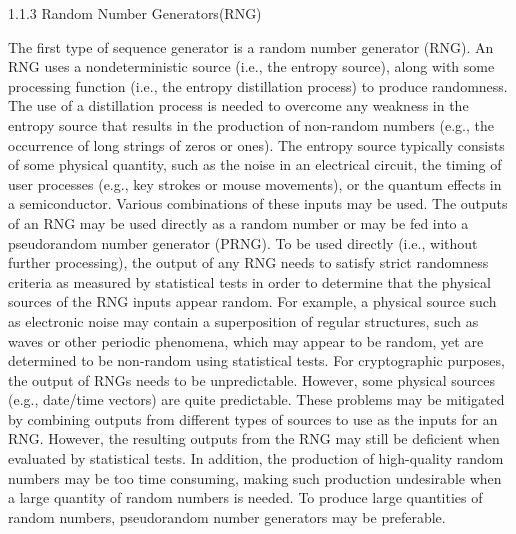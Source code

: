 1.1.3 Random Number Generators(RNG)

The first type of sequence generator is a random number generator (RNG). An RNG uses a nondeterministic source (i.e., the entropy source), along with some processing function (i.e., the entropy distillation process) to produce randomness. The use of a distillation process is needed to overcome any weakness in the entropy source that results in the production of non-random numbers (e.g., the occurrence of long strings of zeros or ones). The entropy source typically consists of some physical quantity, such as the noise in an electrical circuit, the timing of user processes (e.g., key strokes or mouse movements), or the quantum effects in a semiconductor. Various combinations of these inputs may be used. The outputs of an RNG may be used directly as a random number or may be fed into a pseudorandom number generator (PRNG). To be used directly (i.e., without further processing), the output of any RNG needs to satisfy strict randomness criteria as measured by statistical tests in order to determine that the physical sources of the RNG inputs appear random. For example, a physical source such as electronic noise may contain a superposition of regular structures, such as waves or other periodic phenomena, which may appear to be random, yet are determined to be non-random using statistical tests. For cryptographic purposes, the output of RNGs needs to be unpredictable. However, some physical sources (e.g., date/time vectors) are quite predictable. These problems may be mitigated by combining outputs from different types of sources to use as the inputs for an RNG. However, the resulting outputs from the RNG may still be deficient when evaluated by statistical tests. In addition, the production of high-quality random numbers may be too time consuming, making such production undesirable when a large quantity of random numbers is needed. To produce large quantities of random numbers, pseudorandom number generators may be preferable. 

